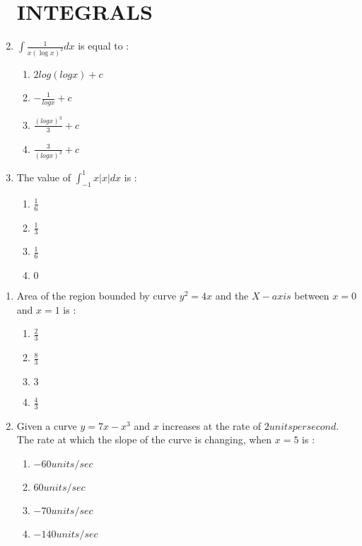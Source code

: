 \documentclass{article}
\begin{document}
\begin{enumerate}
		\section{INTEGRALS}
\item $\int \frac{1}{x(\log x)^2} dx$ is equal to :                                                                                                                                      \begin{enumerate}[label=(\Alph*)]
\item $2log(logx)+c$
\item $-\frac{1}{logx}+c$
\item $\frac{(logx)^3}{3}+c$
\item $\frac{3}{(logx)^3}+c$
        \end{enumerate}

        \item The value of $\int_{-1}^{1} x|x|dx$ is :
                \begin{enumerate}[label=(\Alph*)]
\item $\frac{1}{6}$
\item $\frac{1}{3}$
\item $\frac{1}{6}$
\item $0$
        \end{enumerate}
\end{enumerate}
\begin{enumerate}
		\section{AREA AND CURVES}
\item Area of the region bounded by curve $y^2 = 4x$ and the $X-axis$ between $x = 0$ and $x = 1$ is :
        \begin{enumerate}[label=(\Alph*)]
\item $\frac{2}{3}$
\item $\frac{8}{3}$
\item $3$
\item $\frac{4}{3}$
\end{enumerate}
                \item Given a curve $y = 7x - x^3$ and $x$ increases at the rate of $2 units per second$. The rate at which the slope of the curve is changing, when $x = 5$ is :
                \begin{enumerate}[label=(\Alph*)]
                \item $-60 units/sec$                                                                                                                                                            \item $60 units/sec$
                \item $-70 units/sec$
                \item $-140 units/sec$
                \end{enumerate}
\end{enumerate}
\end{document}
